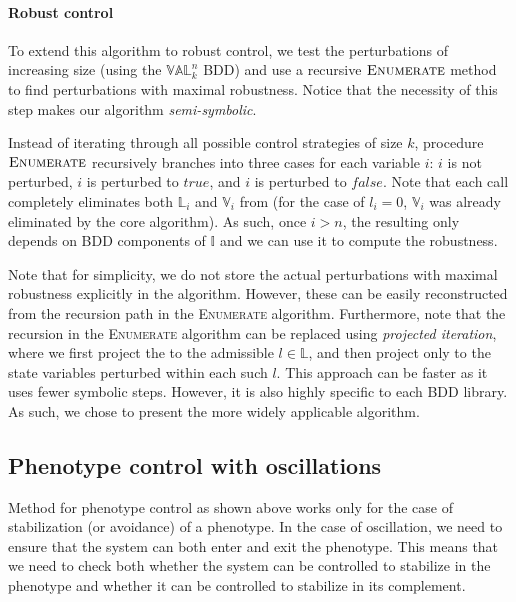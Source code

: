 \paragraph{Robust control}

To extend this algorithm to robust control, we test the perturbations of increasing size (using the $\mathbb{VAL}_{k}^{n}$ BDD) and use a recursive $\textsc{Enumerate}$ method to find perturbations with maximal robustness. Notice that the necessity of this step makes our algorithm \emph{semi-symbolic}. 

Instead of iterating through all possible control strategies of size $k$, procedure $\textsc{Enumerate}$ recursively branches into three cases for each variable $i$: $i$ is not perturbed, $i$ is perturbed to $\mathit{true}$, and $i$ is perturbed to $\mathit{false}$. Note that each call completely eliminates both $\mathbb{L}_i$ and $\mathbb{V}_i$ from  (for the case of $l_i = 0$, $\mathbb{V}_i$ was already eliminated by the core algorithm). As such, once $i > n$, the resulting  only depends on BDD components of $\mathbb{I}$ and we can use it to compute the robustness.

Note that for simplicity, we do not store the actual perturbations with maximal robustness explicitly in the algorithm. However, these can be easily reconstructed from the recursion path in the \textsc{Enumerate} algorithm. Furthermore, note that the recursion in the \textsc{Enumerate} algorithm can be replaced using \emph{projected iteration}, where we first project the  to the admissible $l \in \mathbb{L}$, and then project only to the state variables perturbed within each such $l$. This approach can be faster as it uses fewer symbolic steps. However, it is also highly specific to each BDD library. As such, we chose to present the more widely applicable algorithm.


\subsection{Phenotype control with oscillations}

Method for phenotype control as shown above works only for the case of stabilization (or avoidance) of a phenotype. In the case of oscillation, we need to ensure that the system can both enter and exit the phenotype. This means that we need to check both whether the system can be controlled to stabilize in the phenotype and whether it can be controlled to stabilize in its complement.

